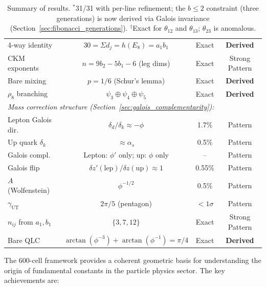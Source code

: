 \documentclass[12pt,a4paper]{article}
\begin{document}
\begin{table}[H]
\begin{tabular}{lccc}
4-way identity & $30 = \Sigma d_j = h(E_8) = a_1 b_1$ & Exact & \textbf{Derived} \\
CKM exponents & $n = 9b_2 - 5b_1 - 6$ (leg dims) & Exact & Strong Pattern \\
Bare mixing & $p = 1/6$ (Schur's lemma) & Exact & \textbf{Derived} \\
$\rho_8$ branching & $\psi_3 \oplus \psi_4 \oplus \psi_5$ & Exact & \textbf{Derived} \\
\midrule
\multicolumn{4}{l}{\textit{Mass correction structure (Section~\ref{sec:galois_complementarity}):}} \\
Lepton Galois dir. & $\delta_d/\delta_k \approx -\phi$ & 1.7\% & Pattern \\
Up quark $\delta_k$ & $\approx \alpha_s$ & 0.5\% & Pattern \\
Galois compl. & Lepton: $\phi'$ only; up: $\phi$ only & -- & Pattern \\
Galois flip & $\delta z'(\text{lep})/\delta z(\text{up}) \approx 1$ & 0.55\% & Pattern \\
$A$ (Wolfenstein) & $\phi^{-1/2}$ & 0.5\% & Pattern \\
$\gamma_{\text{UT}}$ & $2\pi/5$ (pentagon) & $<1\sigma$ & Pattern \\
$n_{ij}$ from $a_1, b_1$ & $\{3,7,12\}$ & Exact & Strong Pattern \\
Bare QLC & $\arctan(\phi^{-3})+\arctan(\phi^{-1})=\pi/4$ & Exact & \textbf{Derived} \\
\bottomrule
\end{tabular}
\caption{Summary of results. $^*$31/31 with per-line refinement; the $b \leq 2$ constraint (three generations) is now derived via Galois invariance (Section~\ref{sec:fibonacci_generations}). $^\dagger$Exact for $\theta_{12}$ and $\theta_{13}$; $\theta_{23}$ is anomalous.}
\end{table}



The 600-cell framework provides a coherent geometric basis for understanding the origin of fundamental constants in the particle physics sector. The key achievements are:
\end{document}
